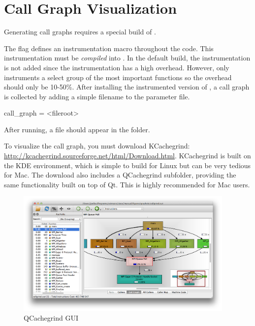 

\section{Call Graph Visualization}
\label{sec:tutorials:callgraph}
Generating call graphs requires a special build of \sstmacro.

The  flag defines an instrumentation macro throughout the \sstmacro code.
This instrumentation must be \emph{compiled} into \sstmacro.
In the default build, the instrumentation is not added since the instrumentation has a high overhead.
However, \sstmacro only instruments a select group of the most important functions so the overhead should only be 10-50\%.
After installing the instrumented version of \sstmacro, a call graph is collected by adding a simple filename to the parameter file.

\begin{ViFile}
call_graph = <fileroot>
\end{ViFile}
After running, a  file should appear in the folder.

To visualize the call graph, you must download KCachegrind: \url{http://kcachegrind.sourceforge.net/html/Download.html}.
KCachegrind is built on the KDE environment, which is simple to build for Linux but can be very tedious for Mac.
The download also includes a QCachegrind subfolder, providing the same functionality built on top of Qt.  
This is highly recommended for Mac users.

\begin{figure}[h]
\centering
\includegraphics[width=0.95\textwidth]{figures/graphviz/gui.png}
\caption{QCachegrind GUI}
\label{fig:qcgui}
\end{figure}

